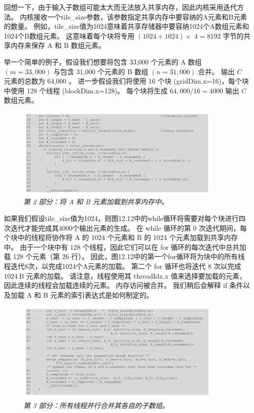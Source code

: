 回想一下，由于输入子数组可能太大而无法放入共享内存，因此内核采用迭代方法。 
内核接收一个tile\_size参数，该参数指定共享内存中要容纳的$\mathrm{A}$元素和$\mathrm{B}$元素的数量。 
例如，tile\_size值为1024意味着共享存储器中要容纳1024个A数组元素和1024个B数组元素。 
这意味着每个块将专用 $(1024+1024) \times$ $4=8192$ 字节的共享内存来保存 A 和 B 数组元素。

举一个简单的例子，假设我们想要将包含 33,000 个元素的 A 数组 $(m=33,000)$ 
与包含 31,000 个元素的 B 数组 $(n=31,000)$ 合并。 输出 $C$ 元素的总数为 64,000 。 
进一步假设我们将使用 16 个块 (gridDim.x=16)，每个块中使用 128 个线程 (blockDim.x=128)。 
每个块将生成 $64,000 / 16=4000$ 输出 $C$ 数组元素。

\begin{figure}[H]
	\centering
	\includegraphics[width=0.9\textwidth]{figs/F12.12.png}
	\caption{\textit{第 2 部分：将 A 和 B 元素加载到共享内存中。}}
\end{figure}

如果我们假设tile\_size值为1024，则图12.12中的while循环将需要对每个块进行四次迭代才能完成其4000个输出元素的生成。 
在 while 循环的第 0 次迭代期间，每个块中的线程将协作将 A 的 1024 个元素和 B 的 1024 个元素加载到共享内存中。 
由于一个块中有 128 个线程，因此它们可以在 for 循环的每次迭代中总共加载 128 个元素（第 26 行）。 
因此，图12.12中的第一个for循环将为块中的所有线程迭代8次，以完成1024个A元素的加载。 
第二个 for 循环也将迭代 8 次以完成 $1024 \mathrm{~B}$ 元素的加载。 
请注意，线程使用其 threadIdx.x 值来选择要加载的元素，因此连续的线程会加载连续的元素。 
内存访问被合并。 我们稍后会解释 if 条件以及加载 A 和 B 元素的索引表达式是如何制定的。

\begin{figure}[H]
	\centering
	\includegraphics[width=0.9\textwidth]{figs/F12.13.png}
	\caption{\textit{第 3 部分：所有线程并行合并其各自的子数组。}}
\end{figure}

